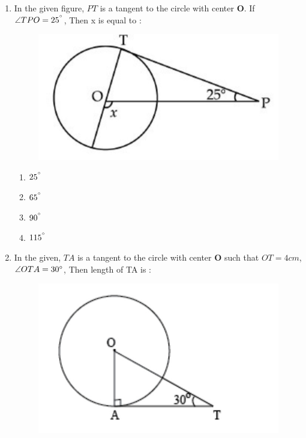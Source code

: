 \documentclass{article}
\let\vec\mathbf
\begin{document}
\begin{enumerate}
\begin{figure}[H]
                        \caption{}  
                        \label{fig}
		\end{figure}
	\item In the given figure, $ PT $ is a tangent to the circle with center $\vec{O}$. If $ \angle{TPO}=
		25^{\degree} $, Then x is equal to :
		\begin{figure}[H]
			\centering
			\includegraphics[width=\columnwidth]{fig9.jpg}
			\caption{}
			\label{fig}
		\end{figure}
		\begin{enumerate}
			\item $ 25^{\degree} $
			\item $ 65^{\degree} $
			\item $ 90^{\degree} $
			\item $ 115^{\degree} $
		\end{enumerate}
	\item In the given, $ TA $ is a tangent to the circle with center $ \vec{O} $ such that $ OT = 4 cm $, 
		$ \angle{OTA}=30{\degree} $, Then length of TA is :
		\begin{figure}[H]
			\centering
			\includegraphics[width=\columnwidth]{fig10.jpg}

\end{figure}
\end{enumerate}
\end{document}

